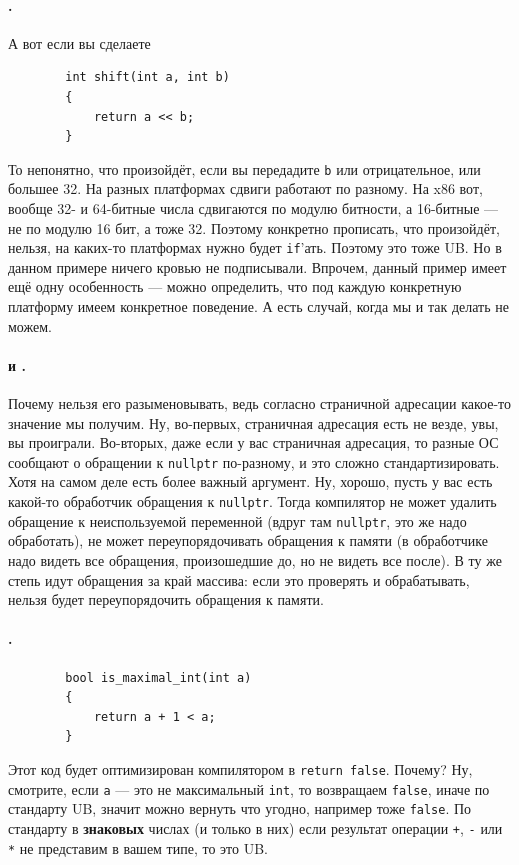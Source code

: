 \documentclass{article}
\begin{document}
    \paragraph{.}
    А вот если вы сделаете
    \begin{verbatim}
        int shift(int a, int b)
        {
            return a << b;
        }
    \end{verbatim}
    То непонятно, что произойдёт, если вы передадите \texttt{b} или отрицательное, или большее 32. На разных платформах сдвиги работают по разному. На x86 вот, вообще 32- и 64-битные числа сдвигаются по модулю битности, а 16-битные --- не по модулю 16 бит, а тоже 32. Поэтому конкретно прописать, что произойдёт, нельзя, на каких-то платформах нужно будет \texttt{if}'ать. Поэтому это тоже UB. Но в данном примере ничего кровью не подписывали. Впрочем, данный пример имеет ещё одну особенность --- можно определить, что под каждую конкретную платформу имеем конкретное поведение. А есть случай, когда мы и так делать не можем.
    \paragraph{ и .}
    Почему нельзя его разыменовывать, ведь согласно страничной адресации какое-то значение мы получим. Ну, во-первых, страничная адресация есть не везде, увы, вы проиграли. Во-вторых, даже если у вас страничная адресация, то разные ОС сообщают о обращении к \texttt{nullptr} по-разному, и это сложно стандартизировать. Хотя на самом деле есть более важный аргумент. Ну, хорошо, пусть у вас есть какой-то обработчик обращения к \texttt{nullptr}. Тогда компилятор не может удалить обращение к неиспользуемой переменной (вдруг там \texttt{nullptr}, это же надо обработать), не может переупорядочивать обращения к памяти (в обработчике надо видеть все обращения, произошедшие до, но не видеть все после). В ту же степь идут обращения за край массива: если это проверять и обрабатывать, нельзя будет переупорядочить обращения к памяти.
    \paragraph{.}
    \begin{verbatim}
        bool is_maximal_int(int a)
        {
            return a + 1 < a;
        }
    \end{verbatim}
    Этот код будет оптимизирован компилятором в \texttt{return false}. Почему? Ну, смотрите, если \texttt{a} --- это не максимальный \texttt{int}, то возвращаем \texttt{false}, иначе по стандарту UB, значит можно вернуть что угодно, например тоже \texttt{false}. По стандарту в \textbf{знаковых} числах (и только в них) если результат операции \texttt{+}, \texttt{-} или \texttt{*} не представим в вашем типе, то это UB.
\end{document}
